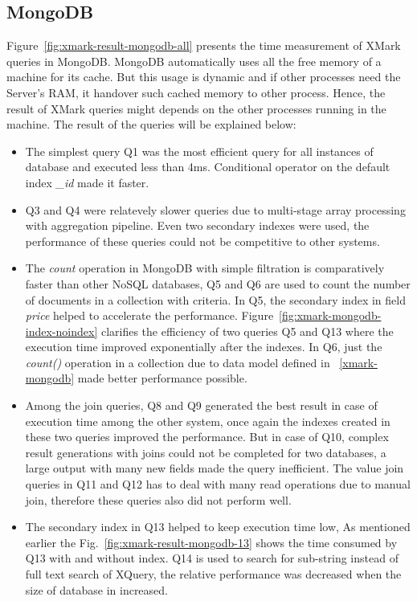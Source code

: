 \subsection{MongoDB}
Figure~\ref{fig:xmark-result-mongodb-all} presents the time measurement of XMark queries in MongoDB. MongoDB automatically uses all the free memory of a machine for its cache. But this usage is dynamic and if other processes need the Server's RAM, it handover such cached memory to other process. Hence, the result of XMark queries might depends on the other processes running in the machine.  The result of the queries will be explained below:
\begin{itemize}
\item The simplest query Q1 was the most efficient query for all instances of database and executed less than 4ms. Conditional operator on the default index \textit{\_id} made it faster.
\item Q3 and Q4 were relatevely slower queries due to multi-stage array processing with aggregation pipeline. Even two secondary indexes were used, the performance of these queries could not be competitive to other systems. 
\item The \textit{count} operation in MongoDB with simple filtration is comparatively faster than other NoSQL databases, Q5 and Q6 are used to count the number of documents in a collection with criteria. In Q5, the secondary index in field \textit{price}  helped to accelerate the performance. Figure~\ref{fig:xmark-mongodb-index-noindex} clarifies the efficiency of two queries Q5 and Q13 where the execution time improved exponentially after the indexes. In Q6, just the \textit{count()} operation in a collection due to data model defined in ~\ref{xmark-mongodb} made better performance possible. 

\item Among the join queries, Q8 and Q9 generated the best result in case of execution time among the other system, once again the indexes created in these two queries improved the performance. But in case of Q10, complex result generations with joins could not be completed for two databases, a large output with many new fields made the query inefficient. The value join queries in Q11 and Q12 has to deal with many read operations due to manual join, therefore these queries also did not perform well.

\item The secondary index in Q13 helped to keep execution time low, As mentioned earlier the Fig.~\ref{fig:xmark-result-mongodb-13} shows the time consumed by Q13  with and without index. Q14 is used to search for sub-string instead of full text search of XQuery, the relative performance was decreased when the size of database in increased.


\end{itemize}
